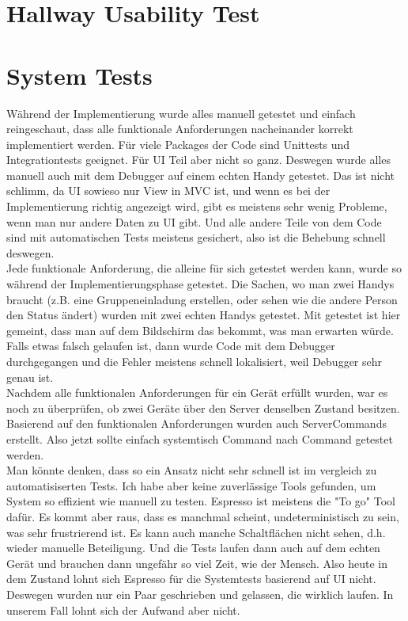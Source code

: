 \documentclass[11pt,a4paper]{scrartcl}
\begin{document}
\section{Hallway Usability Test}

\newpage

\section{System Tests}

Während der Implementierung wurde alles manuell getestet und einfach reingeschaut, dass alle funktionale Anforderungen nacheinander korrekt implementiert werden. Für viele Packages der Code sind Unittests und Integrationtests geeignet. Für UI Teil aber nicht so ganz. Deswegen wurde alles manuell auch mit dem Debugger auf einem echten Handy  getestet. Das ist nicht schlimm, da UI sowieso nur View in MVC ist, und wenn es bei der Implementierung richtig angezeigt wird, gibt es meistens sehr wenig Probleme, wenn man nur andere Daten zu UI gibt. Und alle andere Teile von dem Code sind mit automatischen Tests meistens gesichert, also ist die Behebung schnell deswegen.\\

Jede funktionale Anforderung, die alleine für sich getestet werden kann, wurde so während der Implementierungsphase getestet. Die Sachen, wo man zwei Handys braucht (z.B. eine Gruppeneinladung erstellen, oder sehen wie die andere Person den Status ändert) wurden mit zwei echten Handys getestet. Mit getestet ist hier gemeint, dass man auf dem Bildschirm das bekommt, was man erwarten würde. Falls etwas falsch gelaufen ist, dann wurde Code mit dem Debugger durchgegangen und die Fehler meistens schnell lokalisiert, weil Debugger sehr genau ist.\\

Nachdem alle funktionalen Anforderungen für ein Gerät erfüllt wurden, war es noch zu überprüfen, ob zwei Geräte über den Server denselben Zustand besitzen. Basierend auf den funktionalen Anforderungen wurden auch ServerCommands erstellt. Also jetzt sollte einfach systemtisch Command nach Command getestet werden. \\

Man könnte denken, dass so ein Ansatz nicht sehr schnell ist im vergleich zu automatisiserten Tests. Ich habe aber keine zuverlässige Tools gefunden, um System so effizient wie manuell zu testen. Espresso ist meistens die "To go" Tool dafür. Es kommt aber raus, dass es manchmal scheint, undeterministisch zu sein, was sehr frustrierend ist. Es kann auch manche Schaltflächen nicht sehen, d.h. wieder manuelle Beteiligung. Und die Tests laufen dann auch auf dem echten Gerät und brauchen dann ungefähr so viel Zeit, wie der Mensch. Also heute in dem Zustand lohnt sich Espresso für die Systemtests basierend auf UI nicht. Deswegen wurden nur ein Paar geschrieben und gelassen, die wirklich laufen. In unserem Fall lohnt sich der Aufwand aber nicht.\\
\end{document}
